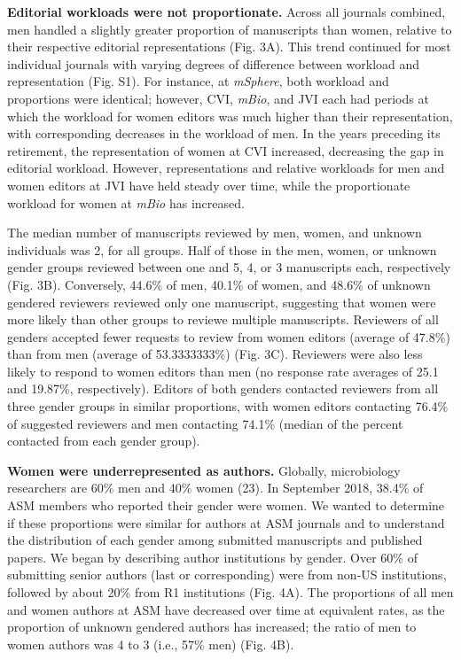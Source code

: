 \documentclass[11pt,]{article}
\begin{document}
\textbf{Editorial workloads were not proportionate.} Across all journals
combined, men handled a slightly greater proportion of manuscripts than
women, relative to their respective editorial representations (Fig. 3A).
This trend continued for most individual journals with varying degrees
of difference between workload and representation (Fig. S1). For
instance, at \emph{mSphere}, both workload and proportions were
identical; however, CVI, \emph{mBio}, and JVI each had periods at which
the workload for women editors was much higher than their
representation, with corresponding decreases in the workload of men. In
the years preceding its retirement, the representation of women at CVI
increased, decreasing the gap in editorial workload. However,
representations and relative workloads for men and women editors at JVI
have held steady over time, while the proportionate workload for women
at \emph{mBio} has increased.

The median number of manuscripts reviewed by men, women, and unknown
individuals was 2, for all groups. Half of those in the men, women, or
unknown gender groups reviewed between one and 5, 4, or 3 manuscripts
each, respectively (Fig. 3B). Conversely, 44.6\% of men, 40.1\% of
women, and 48.6\% of unknown gendered reviewers reviewed only one
manuscript, suggesting that women were more likely than other groups to
reviewe multiple manuscripts. Reviewers of all genders accepted fewer
requests to review from women editors (average of 47.8\%) than from men
(average of 53.3333333\%) (Fig. 3C). Reviewers were also less likely to
respond to women editors than men (no response rate averages of 25.1 and
19.87\%, respectively). Editors of both genders contacted reviewers from
all three gender groups in similar proportions, with women editors
contacting 76.4\% of suggested reviewers and men contacting 74.1\%
(median of the percent contacted from each gender group).

\textbf{Women were underrepresented as authors.} Globally, microbiology
researchers are 60\% men and 40\% women (23). In September 2018, 38.4\%
of ASM members who reported their gender were women. We wanted to
determine if these proportions were similar for authors at ASM journals
and to understand the distribution of each gender among submitted
manuscripts and published papers. We began by describing author
institutions by gender. Over 60\% of submitting senior authors (last or
corresponding) were from non-US institutions, followed by about 20\%
from R1 institutions (Fig. 4A). The proportions of all men and women
authors at ASM have decreased over time at equivalent rates, as the
proportion of unknown gendered authors has increased; the ratio of men
to women authors was 4 to 3 (i.e., 57\% men) (Fig. 4B).
\end{document}
